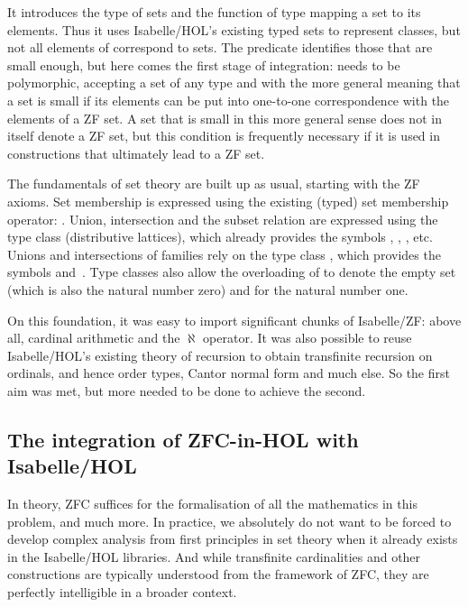 \documentclass[runningheads]{llncs}
\begin{document}
It introduces the type  of sets and the function  of type  mapping  a set to its elements.
Thus it uses Isabelle/HOL's existing typed sets to represent classes, but not all elements of  correspond to sets.
The predicate  identifies those that are small enough, but here comes the first stage of integration:  needs to be polymorphic, accepting a set of any type and with the more general meaning that a set is small if its elements can be put into one-to-one correspondence with the elements of a ZF set.
A set that is small in this more general sense does not in itself denote a ZF set, but this condition is frequently necessary if it is used in constructions that ultimately lead to a ZF set.

The fundamentals of set theory are built up as usual, starting with the ZF axioms.
Set membership is expressed using the existing (typed) set membership operator: .
Union, intersection and the subset relation are expressed using the type class  (distributive lattices), which already provides the symbols \isa{\isasymsqunion}, \isa{\isasymsqinter}, \isa{\isasymle}, etc.
Unions and intersections of families rely on the type class , which provides the symbols \isa{\isasymSqunion} and~\isa{\isasymSqinter}.
Type classes also allow the overloading of  to denote the empty set (which is also the natural number zero) and  for the natural number one.

On this foundation, it was easy to import significant chunks of Isabelle/ZF: above all, cardinal arithmetic and  the $\aleph$ operator. It was also possible to reuse Isabelle/HOL's existing theory of recursion to obtain transfinite recursion on ordinals, and hence order types, Cantor normal form and much else. So the first aim was met, but more needed to be done to achieve the second.

\subsection{The integration of ZFC-in-HOL with Isabelle/HOL}

In theory, ZFC suffices for the formalisation of all the mathematics in this problem, and much more. In practice, we absolutely do not want to be forced to develop complex analysis from first principles in set theory when it already exists in the Isabelle/HOL libraries. 
And while transfinite cardinalities and other constructions are typically understood from the framework of ZFC, they are perfectly intelligible in a broader context.
\end{document}
